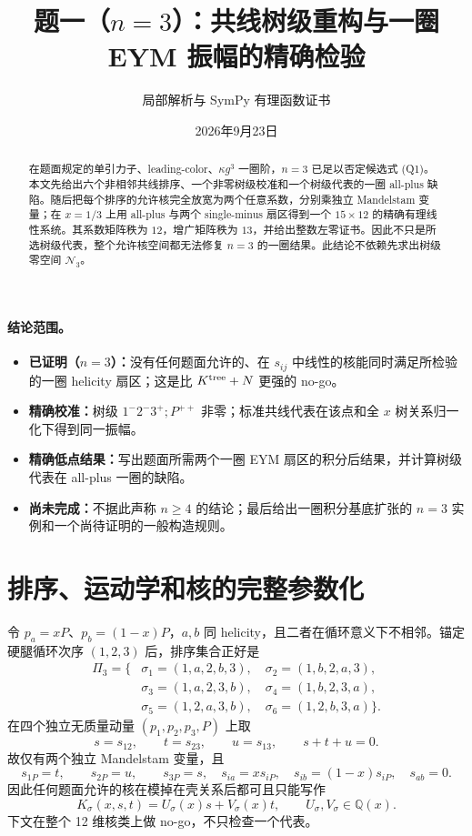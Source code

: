 \documentclass[UTF8,11pt]{ctexart}
\title{题一（$n=3$）：共线树级重构与一圈 EYM 振幅的精确检验}
\author{局部解析与 SymPy 有理函数证书}
\date{2026年9月23日}
\newcommand{\cN}{\mathcal N}
\begin{document}
\maketitle

\begin{abstract}
在题面规定的单引力子、leading-color、$\kappa g^3$ 一圈阶，$n=3$ 已足以否定候选式 (Q1)。本文先给出六个非相邻共线排序、一个非零树级校准和一个树级代表的一圈 all-plus 缺陷。随后把每个排序的允许核完全放宽为两个任意系数，分别乘独立 Mandelstam 变量；在 $x=1/3$ 上用 all-plus 与两个 single-minus 扇区得到一个 $15\times12$ 的精确有理线性系统。其系数矩阵秩为 $12$，增广矩阵秩为 $13$，并给出整数左零证书。因此不只是所选树级代表，整个允许核空间都无法修复 $n=3$ 的一圈结果。此结论不依赖先求出树级零空间 $\cN_3$。
\end{abstract}

\paragraph{结论范围。}
\begin{itemize}
  \item \textbf{已证明（$n=3$）：}没有任何题面允许的、在 $s_{ij}$ 中线性的核能同时满足所检验的一圈 helicity 扇区；这是比 $K^{\rm tree}+N$ 更强的 no-go。
  \item \textbf{精确校准：}树级 $1^-2^-3^+;P^{++}$ 非零；标准共线代表在该点和全 $x$ 树关系归一化下得到同一振幅。
  \item \textbf{精确低点结果：}写出题面所需两个一圈 EYM 扇区的积分后结果，并计算树级代表在 all-plus 一圈的缺陷。
  \item \textbf{尚未完成：}不据此声称 $n\ge4$ 的结论；最后给出一圈积分基底扩张的 $n=3$ 实例和一个尚待证明的一般构造规则。
\end{itemize}

\section{排序、运动学和核的完整参数化}
令 $p_a=xP$、$p_b=(1-x)P$，$a,b$ 同 helicity，且二者在循环意义下不相邻。锚定硬腿循环次序 $(1,2,3)$ 后，排序集合正好是
\begin{align*}
\Pi_3=\{&\sigma_1=(1,a,2,b,3),\quad \sigma_2=(1,b,2,a,3),\\
&\sigma_3=(1,a,2,3,b),\quad \sigma_4=(1,b,2,3,a),\\
&\sigma_5=(1,2,a,3,b),\quad \sigma_6=(1,2,b,3,a)\}.
\end{align*}
在四个独立无质量动量 $(p_1,p_2,p_3,P)$ 上取
\[
s=s_{12},\qquad t=s_{23},\qquad u=s_{13},\qquad s+t+u=0.
\]
故仅有两个独立 Mandelstam 变量，且
\[
s_{1P}=t,\qquad s_{2P}=u,\qquad s_{3P}=s,
\quad s_{ia}=x s_{iP},\quad s_{ib}=(1-x)s_{iP},\quad s_{ab}=0.
\]
因此任何题面允许的核在模掉在壳关系后都可且只能写作
\[
K_\sigma(x,s,t)=U_\sigma(x)s+V_\sigma(x)t,
\qquad U_\sigma,V_\sigma\in\mathbb Q(x).
\]
下文在整个 12 维核类上做 no-go，不只检查一个代表。
\end{document}
